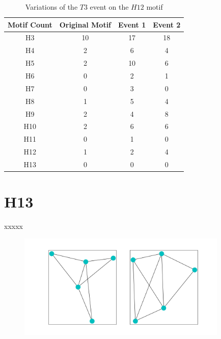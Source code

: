 \begin{table}
    \centering
    \begin{tabular}{||c c c c||} 
    \hline
    Motif Count & Original Motif & Event 1 & Event 2\\ [0.5ex] 
    \hline\hline
    H3 & 10 & 17 & 18 \\ 
    \hline
    H4 & 2 & 6 & 4 \\
    \hline
    H5 & 2 & 10 & 6\\
    \hline
    H6 & 0 & 2 & 1 \\
    \hline
    H7 & 0 & 3 & 0\\
    \hline
    H8 & 1 & 5 & 4 \\
    \hline
    H9 & 2 & 4 & 8 \\
    \hline
    H10 & 2 & 6 & 6 \\
    \hline
    H11 & 0 & 1 & 0 \\
    \hline
    H12 & 1 & 2 & 4 \\
    \hline
    H13 & 0 & 0 & 0\\
    \hline
   \end{tabular}
   \caption{Variations of the $T3$ event on the $H12$ motif}
   \label{table:21}
\end{table}

\section{H13}
xxxxx
\begin{figure}
    \includegraphics[width=10cm]{Images/H13_T3_evolution.png}
    \centering
\end{figure}

